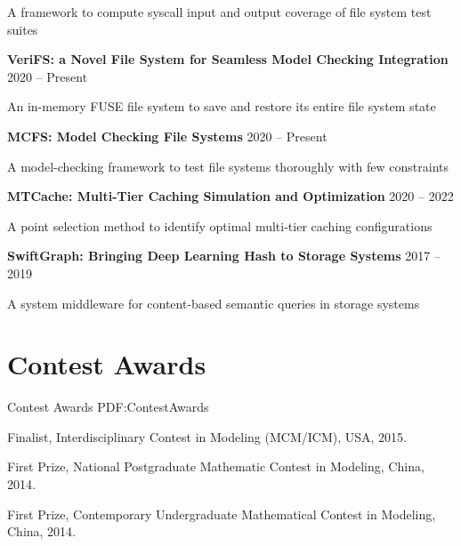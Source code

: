 \documentclass[letterpaper,10pt,oneside]{article}
\begin{document}
\begin{body}
\BulletItem
A framework to compute syscall input and output coverage of file system test suites

\GapNoBreak

\textbf{VeriFS: a Novel File System for Seamless Model Checking Integration}
\hfill
2020 -- 
Present

\BulletItem
An in-memory FUSE file system to save and restore its entire file system state 

\GapNoBreak

\textbf{MCFS: Model Checking File Systems}
\hfill
2020 -- 
Present

\BulletItem
A model-checking framework to test file systems thoroughly with few constraints

\GapNoBreak

\textbf{MTCache: Multi-Tier Caching Simulation and Optimization}
\hfill
2020 -- 
2022

\BulletItem
A point selection method to identify optimal multi-tier caching configurations 

\GapNoBreak

\textbf{SwiftGraph: Bringing Deep Learning Hash to Storage Systems}
\hfill
2017 -- 
2019

\BulletItem
A system middleware for content-based semantic queries in storage systems





\section
{Contest Awards}
{Contest Awards}
{PDF:ContestAwards}

\BulletItem
Finalist, Interdisciplinary Contest in Modeling (MCM/ICM), USA, 2015.

\GapNoBreak

\BulletItem
First Prize, National Postgraduate Mathematic Contest in Modeling, China, 2014.

\GapNoBreak

\BulletItem
First Prize, Contemporary Undergraduate Mathematical Contest in Modeling, China, 2014.



\end{body}
\end{document}
